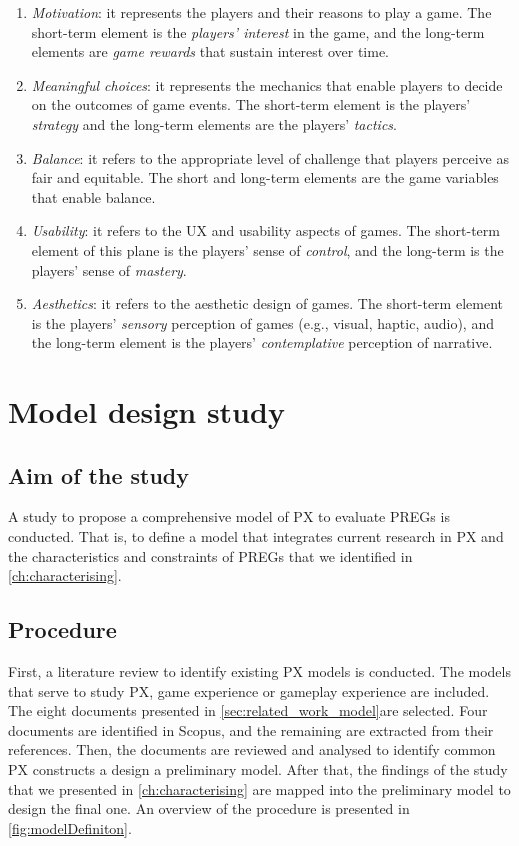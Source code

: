 \begin{enumerate}
    \item \emph{Motivation}: it represents the players and their reasons to play a game. The short-term element is the \textit{players' interest} in the game, and the long-term elements are \textit{game rewards} that sustain interest over time.
    \item \emph{Meaningful choices}: it represents the mechanics that enable players to decide on the outcomes of game events. The short-term element is the players' \textit{strategy} and the long-term elements are the players' \textit{tactics}.
    \item \emph{Balance}: it refers to the appropriate level of challenge that players perceive as fair and equitable. The short and long-term elements are the game variables that enable balance.
    \item \emph{Usability}: it refers to the \ac{UX} and usability aspects of games. The short-term element of this plane is the players' sense of \textit{control}, and the long-term is the players' sense of \textit{mastery}.
    \item \emph{Aesthetics}: it refers to the aesthetic design of games. The short-term element is the players' \textit{sensory} perception of games (e.g., visual, haptic, audio), and the long-term element is the players' \textit{contemplative} perception of narrative.
\end{enumerate}

\section{Model design study} %
\label{sec:model_design}
\subsection{Aim of the study}
A study to propose a comprehensive model of \ac{PX} to evaluate \acp{PREG} is conducted. That is, to define a model that integrates current research in \ac{PX} and the characteristics and constraints of \acp{PREG} that we identified in \autoref{ch:characterising}.

\subsection{Procedure}
First, a literature review to identify existing \ac{PX} models is conducted. The models that serve to study \ac{PX}, game experience or gameplay experience are included. The eight documents presented in \autoref{sec:related_work_model}are selected. Four documents are identified in Scopus, and the remaining are extracted from their references. Then, the documents are reviewed and analysed to identify common \ac{PX} constructs a design a preliminary model. After that, the findings of the study that we presented in \autoref{ch:characterising} are mapped into the preliminary model to design the final one. An overview of the procedure is presented in \autoref{fig:modelDefiniton}.


